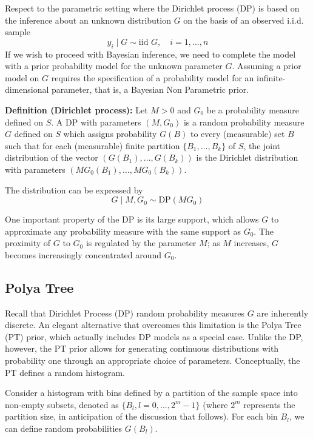\documentclass{article}
\begin{document}
\medskip
Respect to the parametric setting where the Dirichlet process (DP) is based on the inference about an unknown distribution \( G \) on the basis of an observed i.i.d. sample
\[
y_i \mid G \sim \text{iid } G, \quad i = 1, \ldots, n
\]
If we wish to proceed with Bayesian inference, we need to complete the model with a prior probability model for the unknown parameter \( G \). Assuming a prior model on \( G \) requires the specification of a probability model for an infinite-dimensional parameter, that is, a Bayesian Non Parametric prior.
\bigskip



\textbf{Definition (Dirichlet process):} Let \( M > 0 \) and \( G_0 \) be a probability measure defined on \( S \). A DP with parameters \( (M, G_0) \) is a random probability measure \( G \) defined on \( S \) which assigns probability \( G(B) \) to every (measurable) set \( B \) such that for each (measurable) finite partition \( \{B_1, \ldots, B_k\} \) of \( S \), the joint distribution of the vector \( (G(B_1), \ldots, G(B_k)) \) is the Dirichlet distribution with parameters \( (M G_0(B_1), \ldots, M G_0(B_k)) \).

The distribution can be expressed by
\[
G \mid M, G_0 \sim \text{DP}(M G_0)
\]

\medskip
One important property of the DP is its large support, which allows \( G \) to approximate any probability measure with the same support as \( G_0 \). The proximity of \( G \) to \( G_0 \) is regulated by the parameter \( M \); as \( M \) increases, \( G \) becomes increasingly concentrated around \( G_0 \).

\bigskip
\bigskip

\subsection{Polya Tree}
Recall that Dirichlet Process (DP) random probability measures \( G \) are inherently discrete. An elegant alternative that overcomes this limitation is the Polya Tree (PT) prior, which actually includes DP models as a special case. Unlike the DP, however, the PT prior allows for generating continuous distributions with probability one through an appropriate choice of parameters. Conceptually, the PT defines a random histogram.

Consider a histogram with bins defined by a partition of the sample space into non-empty subsets, denoted as \( \{ B_l, l = 0, \ldots, 2^m - 1 \} \) (where \( 2^m \) represents the partition size, in anticipation of the discussion that follows). For each bin \( B_l \), we can define random probabilities \( G(B_l) \).
\end{document}
